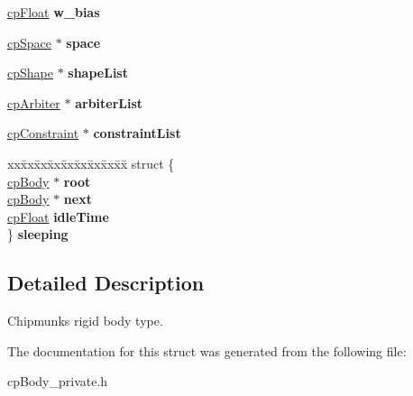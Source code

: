 \begin{DoxyCompactItemize}
\item 
\hypertarget{structcp_body_a0e325a1921aecb201ce2003fa076fce4}{}\hyperlink{group__basic_types_gac1ed65573e035bf892505768c852d8d3}{cp\+Float} {\bfseries w\+\_\+bias}\label{structcp_body_a0e325a1921aecb201ce2003fa076fce4}

\item 
\hypertarget{structcp_body_a320f2647e097c91f24017e2cfc2947d9}{}\hyperlink{structcp_space}{cp\+Space} $\ast$ {\bfseries space}\label{structcp_body_a320f2647e097c91f24017e2cfc2947d9}

\item 
\hypertarget{structcp_body_a72fc82663f9e8788b87c3690dc71cad1}{}\hyperlink{structcp_shape}{cp\+Shape} $\ast$ {\bfseries shape\+List}\label{structcp_body_a72fc82663f9e8788b87c3690dc71cad1}

\item 
\hypertarget{structcp_body_ad50eb713eb75c7706230bb71c7cb4713}{}\hyperlink{structcp_arbiter}{cp\+Arbiter} $\ast$ {\bfseries arbiter\+List}\label{structcp_body_ad50eb713eb75c7706230bb71c7cb4713}

\item 
\hypertarget{structcp_body_ae76ea4e88d6d4af8837230ff9718df15}{}\hyperlink{structcp_constraint}{cp\+Constraint} $\ast$ {\bfseries constraint\+List}\label{structcp_body_ae76ea4e88d6d4af8837230ff9718df15}

\item 
\hypertarget{structcp_body_a65ec505af9c6860d9d6e9f4791d3338b}{}\begin{tabbing}
xx\=xx\=xx\=xx\=xx\=xx\=xx\=xx\=xx\=\kill
struct \{\\
\>\hyperlink{structcp_body}{cpBody} $\ast$ {\bfseries root}\\
\>\hyperlink{structcp_body}{cpBody} $\ast$ {\bfseries next}\\
\>\hyperlink{group__basic_types_gac1ed65573e035bf892505768c852d8d3}{cpFloat} {\bfseries idleTime}\\
\} {\bfseries sleeping}\label{structcp_body_a65ec505af9c6860d9d6e9f4791d3338b}
\\

\end{tabbing}\end{DoxyCompactItemize}


\subsection{Detailed Description}
Chipmunk\textquotesingle{}s rigid body type. 

The documentation for this struct was generated from the following file\+:\begin{DoxyCompactItemize}
\item 
cp\+Body\+\_\+private.\+h\end{DoxyCompactItemize}

